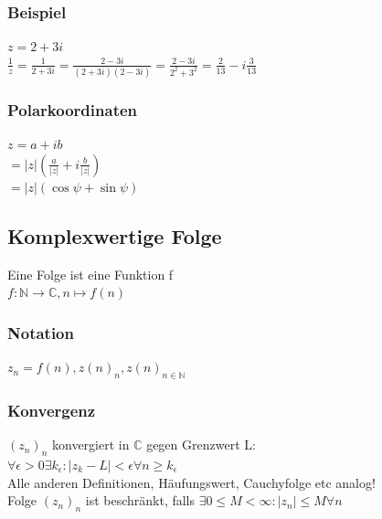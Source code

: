 \documentclass[fleqn]{scrbook}
\newcommand{\N}{\mathbb{N}}
\begin{document}
\subsubsection{Beispiel} $z = 2 +3i$\\
$\frac{1}{z} = \frac{1}{2+3i} = \frac{2-3i}{(2+3i)(2-3i)} = \frac{2-3i}{2^2 + 3^2} = \frac{2}{13} - i\frac{3}{13}$
\subsubsection{Polarkoordinaten} $z = a + ib$\\
$=|z|(\frac{a}{|z|}+i\frac{b}{|z|})$\\
$=|z|(\cos \psi + \sin \psi)$
\subsection{Komplexwertige Folge} Eine Folge ist eine Funktion f\\
$f:\N\rightarrow \mathbb{C},n\mapsto f(n)$
\subsubsection{Notation} $z_n = f(n),z(n)_n, z(n)_{n\in\N}$
\subsubsection{Konvergenz} $(z_n)_n$ konvergiert in $\mathbb{C}$ gegen Grenzwert L:\\
$\forall\epsilon > 0 \exists k_\epsilon : |z_k - L| < \epsilon \forall n \geq k_\epsilon$\\Alle anderen Definitionen, Häufungswert, Cauchyfolge etc analog!\\
Folge $(z_n)_n$ ist beschränkt, falls $\exists 0 \leq M < \infty:|z_n|\leq M \forall n$
\end{document}

